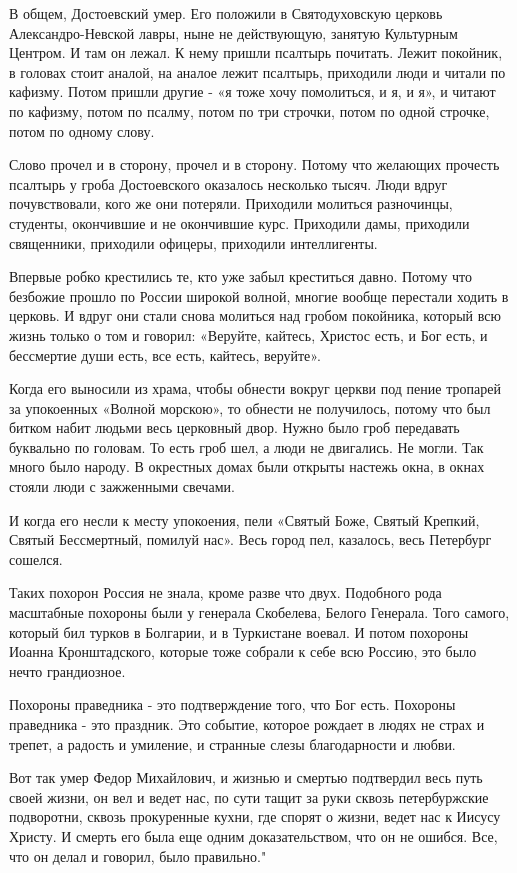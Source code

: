 В общем, Достоевский умер. Его положили в Святодуховскую церковь
Александро-Невской лавры, ныне не действующую, занятую Культурным Центром. И
там он лежал. К нему пришли псалтырь почитать. Лежит покойник, в головах стоит
аналой, на аналое лежит псалтырь, приходили люди и читали по кафизму. Потом
пришли другие - «я тоже хочу помолиться, и я, и я», и читают по кафизму, потом
по псалму, потом по три строчки, потом по одной строчке, потом по одному слову.

Слово прочел и в сторону, прочел и в сторону. Потому что желающих прочесть
псалтырь у гроба Достоевского оказалось несколько тысяч. Люди вдруг
почувствовали, кого же они потеряли. Приходили молиться разночинцы, студенты,
окончившие и не окончившие курс. Приходили дамы, приходили священники,
приходили офицеры, приходили интеллигенты.

Впервые робко крестились те, кто уже забыл креститься давно. Потому что
безбожие прошло по России широкой волной, многие вообще перестали ходить в
церковь. И вдруг они стали снова молиться над гробом покойника, который всю
жизнь только о том и говорил: «Веруйте, кайтесь, Христос есть, и Бог есть, и
бессмертие души есть, все есть, кайтесь, веруйте».

Когда его выносили из храма, чтобы обнести вокруг церкви под пение тропарей за
упокоенных «Волной морскою», то обнести не получилось, потому что был битком
набит людьми весь церковный двор. Нужно было гроб передавать буквально по
головам. То есть гроб шел, а люди не двигались. Не могли. Так много было
народу. В окрестных домах были открыты настежь окна, в окнах стояли люди с
зажженными свечами.

И когда его несли к месту упокоения, пели «Святый Боже, Святый Крепкий, Святый
Бессмертный, помилуй нас». Весь город пел, казалось, весь Петербург сошелся.

Таких похорон Россия не знала, кроме разве что двух. Подобного рода масштабные
похороны были у генерала Скобелева, Белого Генерала. Того самого, который бил
турков в Болгарии, и в Туркистане воевал. И потом похороны Иоанна
Кронштадского, которые тоже собрали к себе всю Россию, это было нечто
грандиозное.

Похороны праведника - это подтверждение того, что Бог есть. Похороны праведника
- это праздник. Это событие, которое  рождает в людях не страх и трепет, а
радость и умиление, и странные слезы благодарности и любви.

Вот так умер Федор Михайлович, и жизнью и смертью подтвердил весь путь своей
жизни, он вел и ведет нас, по сути тащит за руки сквозь петербуржские
подворотни, сквозь прокуренные кухни, где спорят о жизни, ведет нас к Иисусу
Христу. И смерть его была еще одним доказательством, что он не ошибся. Все, что
он делал и говорил, было правильно."

